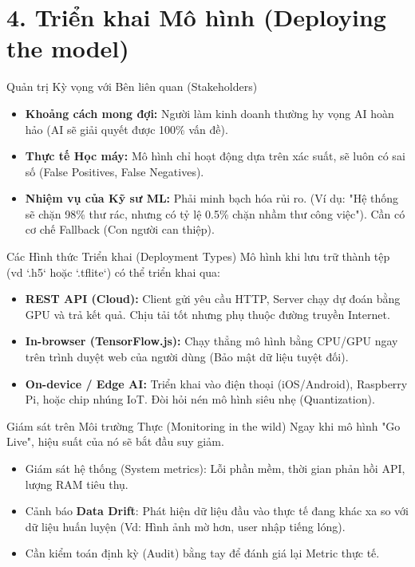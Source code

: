 \documentclass[aspectratio=169]{beamer}
\begin{document}
\section{4. Triển khai Mô hình (Deploying the model)}

\begin{frame}{Quản trị Kỳ vọng với Bên liên quan (Stakeholders)}
    \begin{itemize}
        \item \textbf{Khoảng cách mong đợi:} Người làm kinh doanh thường hy vọng AI hoàn hảo (AI sẽ giải quyết được 100\% vấn đề).
        \item \textbf{Thực tế Học máy:} Mô hình chỉ hoạt động dựa trên xác suất, sẽ luôn có sai số (False Positives, False Negatives).
        \item \textbf{Nhiệm vụ của Kỹ sư ML:} Phải minh bạch hóa rủi ro. (Ví dụ: "Hệ thống sẽ chặn 98\% thư rác, nhưng có tỷ lệ 0.5\% chặn nhầm thư công việc"). Cần có cơ chế Fallback (Con người can thiệp).
    \end{itemize}
\end{frame}

\begin{frame}{Các Hình thức Triển khai (Deployment Types)}
    Mô hình khi lưu trữ thành tệp (vd `.h5` hoặc `.tflite`) có thể triển khai qua:
    \begin{itemize}
        \item \textbf{REST API (Cloud):} Client gửi yêu cầu HTTP, Server chạy dự đoán bằng GPU và trả kết quả. Chịu tải tốt nhưng phụ thuộc đường truyền Internet.
        \item \textbf{In-browser (TensorFlow.js):} Chạy thẳng mô hình bằng CPU/GPU ngay trên trình duyệt web của người dùng (Bảo mật dữ liệu tuyệt đối).
        \item \textbf{On-device / Edge AI:} Triển khai vào điện thoại (iOS/Android), Raspberry Pi, hoặc chip nhúng IoT. Đòi hỏi nén mô hình siêu nhẹ (Quantization).
    \end{itemize}
\end{frame}

\begin{frame}{Giám sát trên Môi trường Thực (Monitoring in the wild)}
    Ngay khi mô hình "Go Live", hiệu suất của nó sẽ bắt đầu suy giảm.
    \begin{itemize}
        \item Giám sát hệ thống (System metrics): Lỗi phần mềm, thời gian phản hồi API, lượng RAM tiêu thụ.
        \item Cảnh báo \textbf{Data Drift}: Phát hiện dữ liệu đầu vào thực tế đang khác xa so với dữ liệu huấn luyện (Vd: Hình ảnh mờ hơn, user nhập tiếng lóng).
        \item Cần kiểm toán định kỳ (Audit) bằng tay để đánh giá lại Metric thực tế.
    \end{itemize}
\end{frame}
\end{document}

